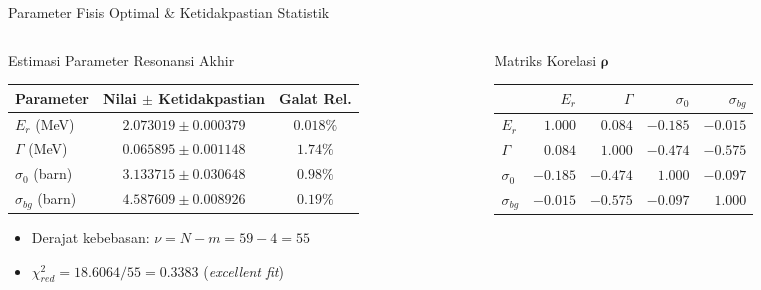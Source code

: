 \documentclass[aspectratio=169, 10pt]{beamer}
\begin{document}
\begin{frame}{Parameter Fisis Optimal \& Ketidakpastian Statistik}
	\begin{columns}[c]
		\begin{column}{0.55\textwidth}
			\begin{block}{Estimasi Parameter Resonansi Akhir}
				\footnotesize
				\begin{table}
					\setlength{\tabcolsep}{4pt}
					\begin{tabular}{l c c}
						\toprule
						\textbf{Parameter} & \textbf{Nilai $\pm$ Ketidakpastian} & \textbf{Galat Rel.} \\
						\midrule
						$E_r$ (MeV) & $2.073019 \pm 0.000379$ & $0.018\%$ \\
						$\Gamma$ (MeV) & $0.065895 \pm 0.001148$ & $1.74\%$ \\
						$\sigma_0$ (barn) & $3.133715 \pm 0.030648$ & $0.98\%$ \\
						$\sigma_{bg}$ (barn) & $4.587609 \pm 0.008926$ & $0.19\%$ \\
						\bottomrule
					\end{tabular}
				\end{table}
				\vspace{0.2cm}
				\small
				\begin{itemize}
					\item Derajat kebebasan: $\nu = N - m = 59 - 4 = 55$
					\item $\chi^2_{red} = 18.6064 / 55 = 0.3383$ (\textit{excellent fit})
				\end{itemize}
			\end{block}
		\end{column}

		\begin{column}{0.45\textwidth}
			\begin{exampleblock}{Matriks Korelasi $\boldsymbol{\rho}$}
				\footnotesize
				\begin{table}
					\setlength{\tabcolsep}{3pt}
					\begin{tabular}{l r r r r}
						\toprule
						& $E_r$ & $\Gamma$ & $\sigma_0$ & $\sigma_{bg}$ \\
						\midrule
						$E_r$ & $1.000$ & $0.084$ & $-0.185$ & $-0.015$ \\
						$\Gamma$ & $0.084$ & $1.000$ & $-0.474$ & $-0.575$ \\
						$\sigma_0$ & $-0.185$ & $-0.474$ & $1.000$ & $-0.097$ \\
						$\sigma_{bg}$ & $-0.015$ & $-0.575$ & $-0.097$ & $1.000$ \\
						\bottomrule
					\end{tabular}
				\end{table}
			\end{exampleblock}
		\end{column}
	\end{columns}
\end{frame}
\end{document}
